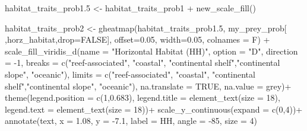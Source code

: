 \documentclass[
]{article}
\newenvironment{Shaded}{\begin{snugshade}}{\end{snugshade}}
\newcommand{\AttributeTok}[1]{\textcolor[rgb]{0.77,0.63,0.00}{#1}}
\newcommand{\ConstantTok}[1]{\textcolor[rgb]{0.00,0.00,0.00}{#1}}
\newcommand{\DecValTok}[1]{\textcolor[rgb]{0.00,0.00,0.81}{#1}}
\newcommand{\FloatTok}[1]{\textcolor[rgb]{0.00,0.00,0.81}{#1}}
\newcommand{\FunctionTok}[1]{\textcolor[rgb]{0.00,0.00,0.00}{#1}}
\newcommand{\NormalTok}[1]{#1}
\newcommand{\OtherTok}[1]{\textcolor[rgb]{0.56,0.35,0.01}{#1}}
\newcommand{\SpecialCharTok}[1]{\textcolor[rgb]{0.00,0.00,0.00}{#1}}
\newcommand{\StringTok}[1]{\textcolor[rgb]{0.31,0.60,0.02}{#1}}
\begin{document}
\begin{Shaded}
\begin{Highlighting}[]
\NormalTok{habitat\_traits\_prob1}\FloatTok{.5} \OtherTok{\textless{}{-}}\NormalTok{ habitat\_traits\_prob1 }\SpecialCharTok{+} \FunctionTok{new\_scale\_fill}\NormalTok{()}

\NormalTok{habitat\_traits\_prob2 }\OtherTok{\textless{}{-}} \FunctionTok{gheatmap}\NormalTok{(habitat\_traits\_prob1}\FloatTok{.5}\NormalTok{, my\_prey\_prob[ ,}\StringTok{\textquotesingle{}horz\_habitat\textquotesingle{}}\NormalTok{,}\AttributeTok{drop=}\ConstantTok{FALSE}\NormalTok{], }
                                 \AttributeTok{offset=}\FloatTok{0.05}\NormalTok{, }\AttributeTok{width=}\FloatTok{0.05}\NormalTok{, }\AttributeTok{colnames =}\NormalTok{ F) }\SpecialCharTok{+}
  \FunctionTok{scale\_fill\_viridis\_d}\NormalTok{(}\AttributeTok{name =} \StringTok{"Horizontal Habitat (HH)"}\NormalTok{, }
                       \AttributeTok{option =} \StringTok{"D"}\NormalTok{, }
                       \AttributeTok{direction =} \SpecialCharTok{{-}}\DecValTok{1}\NormalTok{,}
                       \AttributeTok{breaks =} \FunctionTok{c}\NormalTok{(}\StringTok{"reef{-}associated"}\NormalTok{, }\StringTok{"coastal"}\NormalTok{, }\StringTok{"continental shelf"}\NormalTok{,}\StringTok{"continental slope"}\NormalTok{, }\StringTok{"oceanic"}\NormalTok{),}
                       \AttributeTok{limits =} \FunctionTok{c}\NormalTok{(}\StringTok{"reef{-}associated"}\NormalTok{, }\StringTok{"coastal"}\NormalTok{, }\StringTok{"continental shelf"}\NormalTok{,}\StringTok{"continental slope"}\NormalTok{, }\StringTok{"oceanic"}\NormalTok{),}
                       \AttributeTok{na.translate =} \ConstantTok{TRUE}\NormalTok{, }
                       \AttributeTok{na.value =} \StringTok{\textquotesingle{}grey\textquotesingle{}}\NormalTok{)}\SpecialCharTok{+}
  \FunctionTok{theme}\NormalTok{(}\AttributeTok{legend.position =} \FunctionTok{c}\NormalTok{(}\DecValTok{1}\NormalTok{,}\FloatTok{0.683}\NormalTok{),}
        \AttributeTok{legend.title =} \FunctionTok{element\_text}\NormalTok{(}\AttributeTok{size =} \DecValTok{18}\NormalTok{), }
        \AttributeTok{legend.text =} \FunctionTok{element\_text}\NormalTok{(}\AttributeTok{size =} \DecValTok{18}\NormalTok{))}\SpecialCharTok{+}
  \FunctionTok{scale\_y\_continuous}\NormalTok{(}\AttributeTok{expand =} \FunctionTok{c}\NormalTok{(}\DecValTok{0}\NormalTok{,}\DecValTok{4}\NormalTok{))}\SpecialCharTok{+}
\FunctionTok{annotate}\NormalTok{(}\StringTok{\textquotesingle{}text\textquotesingle{}}\NormalTok{, }\AttributeTok{x =} \FloatTok{1.08}\NormalTok{, }\AttributeTok{y =} \SpecialCharTok{{-}}\FloatTok{7.1}\NormalTok{, }\AttributeTok{label =} \StringTok{\textquotesingle{}HH\textquotesingle{}}\NormalTok{, }\AttributeTok{angle =} \SpecialCharTok{{-}}\DecValTok{85}\NormalTok{, }\AttributeTok{size =} \DecValTok{4}\NormalTok{)}


\end{Highlighting}
\end{Shaded}
\end{document}
